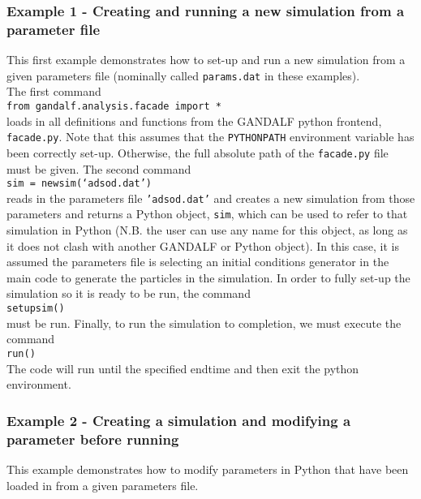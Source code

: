 \documentclass[a4paper]{article}
\newcommand{\var}[1]{\texttt{#1}}
\newcommand{\singlecommand}[1]{\\ \newline \indent \var{#1} \\ \newline \noindent}
\begin{document}
\subsubsection{Example 1 - Creating and running a new simulation from a parameter file}
This first example demonstrates how to set-up and run a new simulation from a given parameters file (nominally called \var{params.dat} in these examples).  \\




\noindent The first command \singlecommand{from gandalf.analysis.facade import *} loads in all definitions and functions from the GANDALF python frontend, \var{facade.py}.  Note that this assumes that the \var{PYTHONPATH} environment variable has been correctly set-up.  Otherwise, the full absolute path of the \var{facade.py} file must be given.  The second command \singlecommand{sim = newsim(`adsod.dat')} reads in the parameters file \var{'adsod.dat'} and creates a new simulation from those parameters and returns a Python object, \var{sim}, which can be used to refer to that simulation in Python (N.B. the user can use any name for this object, as long as it does not clash with another GANDALF or Python object).  In this case, it is assumed the parameters file is selecting an initial conditions generator in the main code to generate the particles in the simulation.  In order to fully set-up the simulation so it is ready to be run, the command \singlecommand{setupsim()} must be run.  Finally, to run the simulation to completion, we must execute the command \singlecommand{run()}  The code will run until the specified endtime and then exit the python environment.
\newpage


\subsubsection{Example 2 - Creating a simulation and modifying a parameter before running}
This example demonstrates how to modify parameters in Python that have been loaded in from a given parameters file. \\
\end{document}
